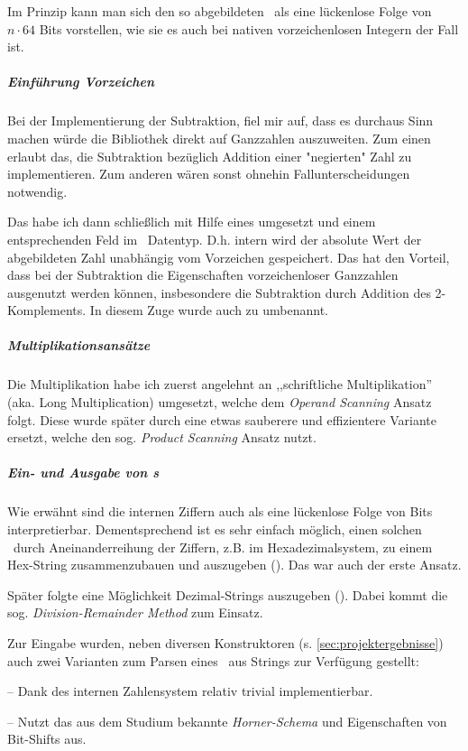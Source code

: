 Im Prinzip kann man sich den so abgebildeten \mpi\ als eine lückenlose Folge von $n \cdot 64$ Bits vorstellen, wie sie es auch bei nativen vorzeichenlosen Integern der Fall ist.

\subparagraph*{Einführung Vorzeichen}
Bei der Implementierung der Subtraktion, fiel mir auf, dass es durchaus Sinn machen würde die Bibliothek direkt auf Ganzzahlen auszuweiten.
Zum einen erlaubt das, die Subtraktion bezüglich Addition einer "negierten" Zahl zu implementieren.
Zum anderen wären sonst ohnehin Fallunterscheidungen notwendig.

Das habe ich dann schließlich mit Hilfe eines  umgesetzt und einem entsprechenden Feld im \mpi\ Datentyp. D.h. intern wird der absolute Wert der abgebildeten Zahl unabhängig vom Vorzeichen gespeichert. Das hat den Vorteil, dass bei der Subtraktion die Eigenschaften vorzeichenloser Ganzzahlen ausgenutzt werden können, insbesondere die Subtraktion durch Addition des 2-Komplements. In diesem Zuge wurde auch  zu  umbenannt.



\subparagraph*{Multiplikationsansätze} Die Multiplikation habe ich zuerst angelehnt an ,,schriftliche Multiplikation'' (aka. Long Multiplication) umgesetzt, welche dem \emph{Operand Scanning} Ansatz folgt.
Diese wurde später durch eine etwas sauberere und effizientere Variante ersetzt, welche den sog. \emph{Product Scanning} Ansatz nutzt.


\subparagraph*{Ein- und Ausgabe von \mpi{}s}
Wie erwähnt sind die internen Ziffern auch als eine lückenlose Folge von Bits interpretierbar. Dementsprechend ist es sehr einfach möglich, einen solchen \mpi\ durch Aneinanderreihung der Ziffern, z.B. im Hexadezimalsystem, zu einem Hex-String zusammenzubauen und auszugeben (). Das war auch der erste Ansatz.

Später folgte eine Möglichkeit Dezimal-Strings auszugeben (). Dabei kommt die sog. \emph{Division-Remainder Method} zum Einsatz.

Zur Eingabe wurden, neben diversen Konstruktoren (s. \autoref{sec:projektergebnisse}) auch zwei Varianten zum Parsen eines \mpi\ aus Strings zur Verfügung gestellt:

\begin{description} \tightlist
    \item [\ilc{from\_hex\_str}] -- Dank des internen Zahlensystem relativ trivial implementierbar.
    \item [\ilc{from\_dec\_str}] -- Nutzt das aus dem Studium bekannte \emph{Horner-Schema} und Eigenschaften von Bit-Shifts aus.
\end{description}


